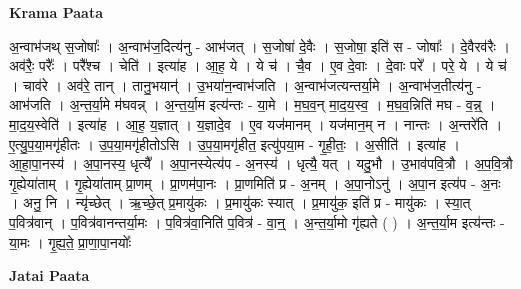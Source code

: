 \documentclass[17pt]{extarticle}
\begin{document}
\textbf{Krama Paata} \newline

अ॒न्वाभ॑जथ् स॒जोषाः᳚ । अ॒न्वाभ॑ज॒दित्य॑नु - आभ॑जत् । स॒जोषा॑ दे॒वैः । स॒जोषा॒ इति॑ स - जोषाः᳚ । दे॒वैरव॑रैः । अव॑रैः॒ परैः᳚ । परै᳚श्च । चेति॑ । इत्या॑ह । आ॒ह॒ ये । ये च॑ । चै॒व । ए॒व दे॒वाः । दे॒वाः परे᳚ । परे॒ ये । ये च॑ । चाव॑रे । अव॑रे॒ तान् । तानु॒भयान्॑ । उ॒भया॑न॒न्वाभ॑जति । अ॒न्वाभ॑जत्यन्तर्या॒मे । अ॒न्वाभ॑ज॒तीत्य॑नु - आभ॑जति । अ॒न्त॒र्या॒मे म॑घवन्न् । अ॒न्त॒र्या॒म इत्य॑न्तः - या॒मे । म॒घ॒व॒न् मा॒द॒य॒स्व॒ । म॒घ॒व॒न्निति॑ मघ - व॒न्न्॒ । मा॒द॒य॒स्वेति॑ । इत्या॑ह । आ॒ह॒ य॒ज्ञात् । य॒ज्ञादे॒व । ए॒व यज॑मानम् । यज॑मान॒म् न । नान्तः । अ॒न्तरे॑ति । ए॒त्यु॒प॒या॒मगृ॑हीतः । उ॒प॒या॒मगृ॑हीतोऽसि । उ॒प॒या॒मगृ॑हीत॒ इत्यु॑पया॒म - गृ॒ही॒तः॒ । अ॒सीति॑ । इत्या॑ह । आ॒हा॒पा॒नस्य॑ । अ॒पा॒नस्य॒ धृत्यै᳚ । अ॒पा॒नस्येत्य॑प - अ॒नस्य॑ । धृत्यै॒ यत् । यदु॒भौ । उ॒भाव॑पवि॒त्रौ । अ॒प॒वि॒त्रौ गृ॒ह्येया॑ताम् । गृ॒ह्येया॑ताम् प्रा॒णम् । प्रा॒णम॑पा॒नः । प्रा॒णमिति॑ प्र - अ॒नम् । अ॒पा॒नोऽनु॑ । अ॒पा॒न इत्य॑प - अ॒नः । अनु॒ नि । न्यृ॑च्छेत् । ऋ॒च्छे॒त् प्र॒मायु॑कः । प्र॒मायु॑कः स्यात् । प्र॒मायु॑क॒ इति॑ प्र - मायु॑कः । स्या॒त् प॒वित्र॑वान् । प॒वित्र॑वानन्तर्या॒मः । प॒वित्र॑वा॒निति॑ प॒वित्र॑ - वा॒न्॒ । अ॒न्त॒र्या॒मो गृ॑ह्यते ( ) । अ॒न्त॒र्या॒म इत्य॑न्तः - या॒मः । गृ॒ह्य॒ते॒ प्रा॒णा॒पा॒नयोः᳚ \newline

\textbf{Jatai Paata} \newline
\end{document}
